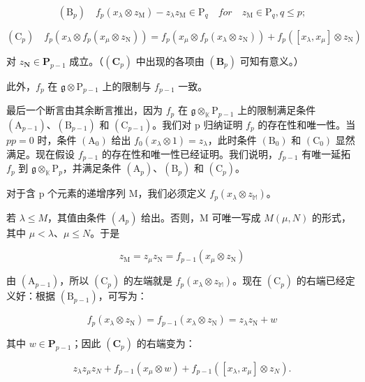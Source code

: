\[
\left(\mathrm{B} _ {p}\right) \quad f _ {p} \left(x _ {\lambda} \otimes z _ {\mathrm{M}}\right) - z _ {\lambda} z _ {\mathrm{M}} \in \mathrm{P} _ {q} \quad for \quad z _ {\mathrm{M}} \in \mathrm{P} _ {q}, q \leqslant p;
\]

\[
\left(\mathrm{C} _ {p}\right) \quad f _ {p} \left(x _ {\lambda} \otimes f _ {p} \left(x _ {\mu} \otimes z _ {\mathrm{N}}\right)\right) = f _ {p} \left(x _ {\mu} \otimes f _ {p} \left(x _ {\lambda} \otimes z _ {\mathrm{N}}\right)\right) + f _ {p} \left(\left[ x _ {\lambda}, x _ {\mu} \right] \otimes z _ {\mathrm{N}}\right)
\]

对 \(z_{\mathbf{N}} \in \mathbf{P}_{p-1}\) 成立。（\((\mathbf{C}_p)\) 中出现的各项由 \((\mathbf{B}_p)\) 可知有意义。）

此外，\(f_{p}\) 在 \(\mathfrak{g} \otimes \mathrm{P}_{p-1}\) 上的限制与 \(f_{p-1}\) 一致。

最后一个断言由其余断言推出，因为 \(f_{p}\) 在 \(\mathfrak{g} \otimes_{\mathbb{K}} \mathrm{P}_{p-1}\) 上的限制满足条件 \((\mathrm{A}_{p-1})\)、\((\mathrm{B}_{p-1})\) 和 \((\mathrm{C}_{p-1})\)。我们对 p 归纳证明 \(f_{p}\) 的存在性和唯一性。当 \(p\)\(p = 0\) 时，条件 \((\mathrm{A}_0)\) 给出 \(f_0(x_\lambda \otimes 1) = z_\lambda\)，此时条件 \((\mathrm{B}_0)\) 和 \((\mathrm{C}_0)\) 显然满足。现在假设 \(f_{p-1}\) 的存在性和唯一性已经证明。我们说明，\(f_{p-1}\) 有唯一延拓 \(f_{p}\) 到 \(\mathfrak{g} \otimes_{\mathbb{K}} \mathrm{P}_{p}\)，并满足条件 \((\mathrm{A}_{p})\)、\((\mathrm{B}_{p})\) 和 \((\mathrm{C}_{p})\)。

对于含 p 个元素的递增序列 M，我们必须定义 \(f_{p}(x_{\lambda} \otimes z_{\mathbb{M}})\)。

若 \(\lambda \leqslant M\)，其值由条件 \((A_p)\) 给出。否则，M 可唯一写成 \(M\)\((\mu, N)\) 的形式，其中 \(\mu < \lambda\)、\(\mu \leqslant N\)。于是

\[
z _ {\mathrm{M}} = z _ {\mu} z _ {\mathrm{N}} = f _ {p - 1} (x _ {\mu} \otimes z _ {\mathrm{N}})
\]

由 \((\mathrm{A}_{p - 1})\)，所以 \((\mathrm{C}_p)\) 的左端就是 \(f_{p}(x_{\lambda}\otimes z_{\mathbb{M}})\)。现在 \((\mathrm{C}_p)\) 的右端已经定义好：根据 \((\mathrm{B}_{p - 1})\)，可写为：

\[
f _ {p} (x _ {\lambda} \otimes z _ {\mathrm{N}}) = f _ {p - 1} (x _ {\lambda} \otimes z _ {\mathrm{N}}) = z _ {\lambda} z _ {\mathrm{N}} + w
\]

其中 \(w \in \mathbf{P}_{p-1}\)；因此 \((\mathbf{C}_p)\) 的右端变为：

\[
z _ {\lambda} z _ {\mu} z _ {N} + f _ {p - 1} (x _ {\mu} \otimes w) + f _ {p - 1} ([ x _ {\lambda}, x _ {\mu} ] \otimes z _ {N}).
\]

